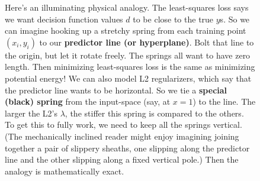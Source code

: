   \begin{figure}%
    \centering
    \caption{%
      Here's an illuminating physical analogy.
      The least-squares loss says we want decision function values $d$ to be
      close to the true $y$s.  So we can imagine hooking up a stretchy {\blu
      spring} from each {\rng training point $(x_i, y_i)$} to our
      \textbf{predictor line (or hyperplane)}.  Bolt that line to the origin,
      but let it rotate freely.  The springs all want to have zero length.
      Then minimizing least-squares loss is the same as minimizing potential
      energy!
      We can also model L2 regularizers, which say that the predictor line wants to be
      horizontal.  So we tie a \textbf{special (black) spring} from the
      input-space (say, at $x=1$) to the line.  The larger the L2's $\lambda$,
      the stiffer this spring is compared to the others.
      To get this to fully work, we need to keep all the springs vertical.
      (The mechanically inclined reader might enjoy imagining joining together
      a pair of slippery sheaths, one slipping along the predictor line and the
      other slipping along a fixed vertical pole.)
      Then the analogy is mathematically exact.
    }
  \end{figure}




  \newpage
{}\marginnote{\veryoptional}

\marginnote{\veryoptional}
  \par\attnsam{}
  \par\attnsam{}
  \par{}
  \par{}

